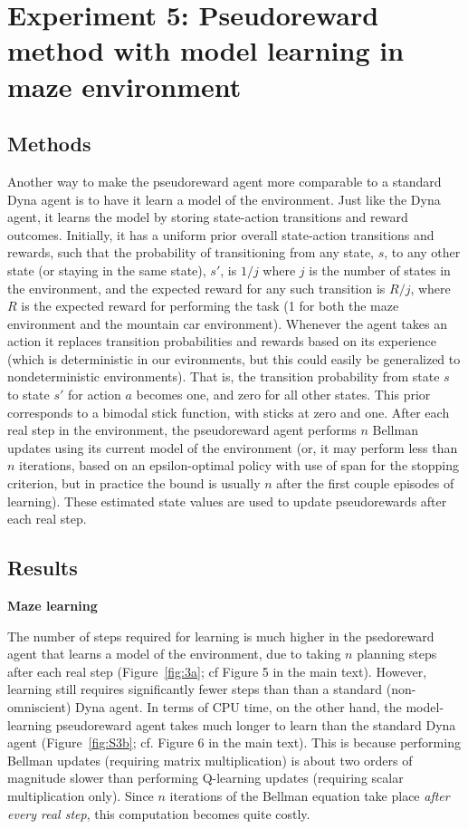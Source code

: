 \documentclass[letterpaper]{article}
\begin{document}
\pagebreak

\section{Experiment 5: Pseudoreward method with model learning in maze environment}

\subsection{Methods}

Another way to make the pseudoreward agent more comparable to a standard Dyna agent is to have it learn a model of the environment. Just like the Dyna agent, it learns the model by storing state-action transitions and reward outcomes. Initially, it has a uniform prior overall state-action transitions and rewards, such that the probability of transitioning from any state, $s$, to any other state (or staying in the same state), $s'$, is $1/j$ where $j$ is the number of states in the environment, and the expected reward for any such transition is $R/j$, where $R$ is the expected reward for performing the task (1 for both the maze environment and the mountain car environment). Whenever the agent takes an action it replaces transition probabilities and rewards based on its experience (which is deterministic in our evironments, but this could easily be generalized to nondeterministic environments). That is, the transition probability from state $s$ to state $s'$ for action $a$ becomes one, and zero for all other states. This prior corresponds to a bimodal stick function, with sticks at zero and one. After each real step in the environment, the pseudoreward agent performs $n$ Bellman updates using its current model of the environment (or, it may perform less than $n$ iterations, based on an epsilon-optimal policy with use of span for the stopping criterion, but in practice the bound is usually $n$ after the first couple episodes of learning). These estimated state values are used to update pseudorewards after each real step.

\subsection{Results}

\textbf{Maze learning}

The number of steps required for learning is much higher in the psedoreward agent that learns a model of the environment, due to taking $n$ planning steps after each real step (Figure~\ref{fig:3a}; cf Figure 5 in the main text). However, learning still requires significantly fewer steps than than a standard (non-omniscient) Dyna agent. In terms of CPU time, on the other hand, the model-learning pseudoreward agent takes much longer to learn than the standard Dyna agent (Figure~\ref{fig:S3b}; cf. Figure 6 in the main text). This is because performing Bellman updates (requiring matrix multiplication) is about two orders of magnitude slower than performing Q-learning updates (requiring scalar multiplication only). Since $n$ iterations of the Bellman equation take place \textit{after every real step}, this computation becomes quite costly.
\end{document}
